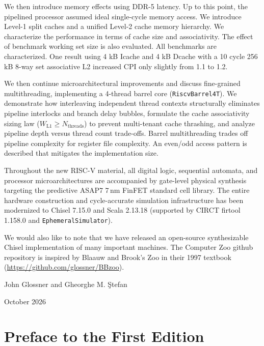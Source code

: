 \documentclass[11pt]{book}
\begin{document}
We then introduce memory effects using DDR-5 latency. Up to this point, the pipelined processor assumed ideal single-cycle memory access. We introduce Level-1 split caches and a unified Level-2 cache memory hierarchy. We characterize the performance in terms of cache size and associativity. The effect of benchmark working set size is also evaluated. All benchmarks are characterized. One result using 4 kB Icache and 4 kB Dcache with a 10 cycle 256 kB 8-way set associative L2 increased CPI only slightly from 1.1 to 1.2.

We then continue microarchitectural improvements and discuss fine-grained multithreading, implementing a 4-thread barrel core (\texttt{RiscvBarrel4T}). We demonstrate how interleaving independent thread contexts structurally eliminates pipeline interlocks and branch delay bubbles, formulate the cache associativity sizing law ($W_{\text{L1}} \ge N_{\text{threads}}$) to prevent multi-tenant cache thrashing, and analyze pipeline depth versus thread count trade-offs. Barrel multithreading trades off pipeline complexity for register file complexity. An even/odd access pattern is described that mitigates the implementation size.

Throughout the new RISC-V material, all digital logic, sequential automata, and processor microarchitectures are accompanied by gate-level physical synthesis targeting the predictive ASAP7 7\,nm FinFET standard cell library. The entire hardware construction and cycle-accurate simulation infrastructure has been modernized to Chisel 7.15.0 and Scala 2.13.18 (supported by CIRCT firtool 1.158.0 and \texttt{EphemeralSimulator}).

We would also like to note that we have released an open-source synthesizable Chisel implementation of many important machines. The Computer Zoo github repository is inspired by Blaauw and Brook's Zoo in their 1997 textbook (\url{https://github.com/glossner/BBzoo}).

\vspace{\baselineskip}\par \noindent
John Glossner and Gheorghe M. \c{S}tefan
\vspace{\baselineskip}\par \noindent
October 2026

\chapter*{Preface to the First Edition}
\end{document}
